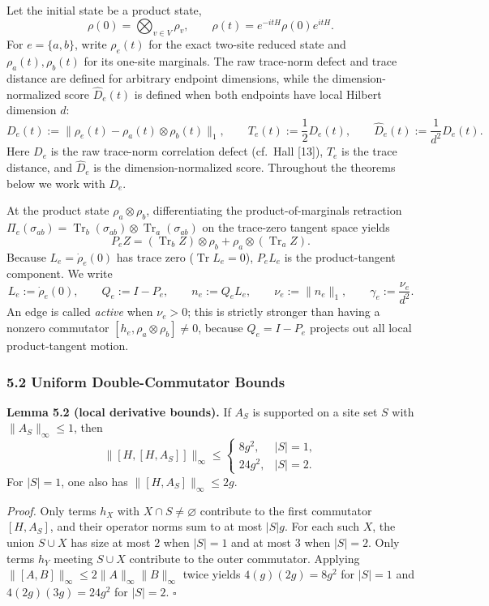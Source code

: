 \documentclass[
  11pt,
]{article}
\begin{document}
Let the initial state be a product state,
\[
\rho(0)=\bigotimes_{v\in V}\rho_v,
\qquad
\rho(t)=e^{-itH}\rho(0)e^{itH}.
\]
For \(e=\{a,b\}\), write \(\rho_e(t)\) for the exact two-site reduced state and \(\rho_a(t),\rho_b(t)\) for its one-site marginals. The raw trace-norm defect and trace distance are defined for arbitrary endpoint dimensions, while the dimension-normalized score \(\widehat D_e(t)\) is defined when both endpoints have local Hilbert dimension \(d\):
\[
D_e(t):=\lVert\rho_e(t)-\rho_a(t)\otimes\rho_b(t)\rVert_1,
\qquad
T_e(t):=\frac12D_e(t),
\qquad
\widehat D_e(t):=\frac{1}{d^2}D_e(t).
\]
Here \(D_e\) is the raw trace-norm correlation defect (cf.~Hall {[}13{]}), \(T_e\) is the trace distance, and \(\widehat D_e\) is the dimension-normalized score. Throughout the theorems below we work with \(D_e\).

At the product state \(\rho_a\otimes\rho_b\), differentiating the product-of-marginals retraction \(\Pi_e(\sigma_{ab})=\operatorname{Tr}_b(\sigma_{ab})\otimes\operatorname{Tr}_a(\sigma_{ab})\) on the trace-zero tangent space yields
\[
P_e Z
=
(\operatorname{Tr}_b Z)\otimes\rho_b
+
\rho_a\otimes(\operatorname{Tr}_a Z).
\]
Because \(L_e = \dot\rho_e(0)\) has trace zero (\(\operatorname{Tr} L_e = 0\)), \(P_e L_e\) is the product-tangent component. We write
\[
L_e:=\dot\rho_e(0),
\qquad
Q_e:=I-P_e,
\qquad
n_e:=Q_eL_e,
\qquad
\nu_e:=\lVert n_e\rVert_1,
\qquad
\gamma_e:=\frac{\nu_e}{d^2}.
\]
An edge is called \emph{active} when \(\nu_e>0\); this is strictly stronger than having a nonzero commutator \([h_e,\rho_a\otimes\rho_b]\neq 0\), because \(Q_e = I - P_e\) projects out all local product-tangent motion.

\subsubsection{5.2 Uniform Double-Commutator Bounds}\label{uniform-double-commutator-bounds}

\textbf{Lemma 5.2 (local derivative bounds).} If \(A_S\) is supported on a site set \(S\) with \(\lVert A_S\rVert_\infty\le1\), then
\[
\lVert[H,[H,A_S]]\rVert_\infty
\le
\begin{cases}
8g^2,&|S|=1,\\
24g^2,&|S|=2.
\end{cases}
\]
For \(|S|=1\), one also has \(\lVert[H,A_S]\rVert_\infty\le2g\).

\emph{Proof.} Only terms \(h_X\) with \(X\cap S\ne\varnothing\) contribute to the first commutator \([H,A_S]\), and their operator norms sum to at most \(|S|g\). For each such \(X\), the union \(S\cup X\) has size at most \(2\) when \(|S|=1\) and at most \(3\) when \(|S|=2\). Only terms \(h_Y\) meeting \(S\cup X\) contribute to the outer commutator. Applying \(\lVert[A,B]\rVert_\infty\le2\lVert A\rVert_\infty\lVert B\rVert_\infty\) twice yields \(4(g)(2g)=8g^2\) for \(|S|=1\) and \(4(2g)(3g)=24g^2\) for \(|S|=2\). \(\square\)
\end{document}
